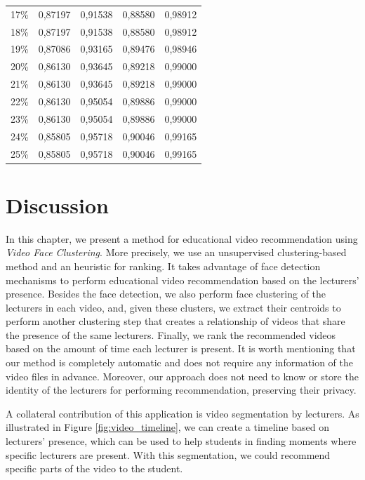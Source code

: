 \begin{table}[!ht]
\begin{tabular}{ccccc}
17\%               & 0,87197         & 0,91538        & 0,88580         & 0,98912   \\
18\%               & 0,87197         & 0,91538        & 0,88580         & 0,98912   \\
19\%               & 0,87086         & 0,93165        & 0,89476         & 0,98946   \\
20\%               & 0,86130         & 0,93645        & 0,89218         & 0,99000   \\
21\%               & 0,86130         & 0,93645        & 0,89218         & 0,99000   \\
22\%               & 0,86130         & 0,95054        & 0,89886         & 0,99000   \\
23\%               & 0,86130         & 0,95054        & 0,89886         & 0,99000   \\
24\%               & 0,85805         & 0,95718        & 0,90046         & 0,99165   \\
25\%               & 0,85805         & 0,95718        & 0,90046         & 0,99165  
\end{tabular}
\end{table}

\section{Discussion}
\label{sec:recommendation_discussion}

In this chapter, we present a method for educational video recommendation using \emph{Video Face Clustering}. More precisely, we use an unsupervised clustering-based method and an heuristic for ranking.
It takes advantage of face detection mechanisms to perform educational video recommendation based on the lecturers' presence.
Besides the face detection, we also perform face clustering of the lecturers in each video, and, given these clusters, we extract their centroids to perform another clustering step that creates a relationship of videos that share the presence of the same lecturers.
Finally, we rank the recommended videos based on the amount of time each lecturer is present.
It is worth mentioning that our method is completely automatic and does not require any information of the video files in advance.  
Moreover, our approach does not need to know or store the identity of the lecturers for performing recommendation, preserving their privacy.

A collateral contribution of this application is video segmentation by lecturers.
As illustrated in Figure \ref{fig:video_timeline}, we can create a timeline based on lecturers' presence, which can be used to help students in finding moments where specific lecturers are present.
With this segmentation, we could recommend specific parts of the video to the student.

